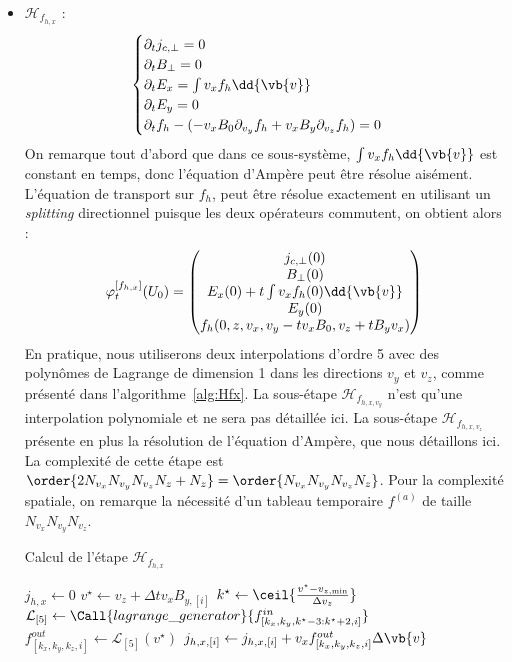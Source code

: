 \begin{itemize}
  \item $\mathcal{H}_{f_{h,x}}$ :
    $$
      \begin{cases}
        \partial_t j_{c,\perp} = 0 \\
        \partial_t B_{\perp} = 0 \\
        \partial_t E_{x} = \int v_xf_h\dd{\vb{v}} \\
        \partial_t E_{y} = 0 \\
        \partial_t f_h - (-v_xB_0\partial_{v_y}f_h + v_xB_y\partial_{v_z}f_h) = 0
      \end{cases}
    $$
    On remarque tout d'abord que dans ce sous-système, $\int v_xf_h\dd{\vb{v}}$ est constant en temps, donc l'équation d'Ampère peut être résolue aisément. L'équation de transport sur $f_h$, peut être résolue exactement en utilisant un \emph{splitting} directionnel puisque les deux opérateurs commutent, on obtient alors :
    $$
      \varphi_t^{[f_{h,x}]}(U_0) = \begin{pmatrix}
        j_{c,\perp}(0) \\
        B_{\perp}(0) \\
        E_x(0) + t\int v_xf_h(0)\dd{\vb{v}} \\
        E_y(0) \\
        f_h(0,z,v_x,v_y-tv_xB_0,v_z+tB_yv_x)
      \end{pmatrix}
    $$
    En pratique, nous utiliserons deux interpolations d'ordre 5 avec des polynômes de Lagrange de dimension 1 dans les directions $v_y$ et $v_z$, comme présenté dans l'algorithme~\ref{alg:Hfx}. La sous-étape $\mathcal{H}_{f_{h,x,v_y}}$ n'est qu'une interpolation polynomiale et ne sera pas détaillée ici. La sous-étape $\mathcal{H}_{f_{h,x,v_z}}$ présente en plus la résolution de l'équation d'Ampère, que nous détaillons ici. La complexité de cette étape est $\order{2N_{v_x}N_{v_y}N_{v_z}N_z + N_z} = \order{N_{v_x}N_{v_y}N_{v_z}N_z}$. Pour la complexité spatiale, on remarque la nécessité d'un tableau temporaire $f^{(a)}$ de taille $N_{v_x}N_{v_y}N_{v_z}$.
    \begin{algorithm}
      \caption{Calcul de l'étape $\mathcal{H}_{f_{h,x}}$}
      \label{alg:Hfx}
      \begin{algorithmic}[1]
          \State $j_{h,x} \gets 0$ 
          \ForAll{$(k_x,k_y,k_z)\in[\![0,N_{v_x}[\![\times[\![0,N_{v_y}[\![\times[\![0,N_{v_z}[\![$}
              \State $v^{\star} \gets v_z + \Delta t v_x B_{y,[i]}$
              \State $k^{\star} \gets \ceil{\frac{ v^{\star}-v_{z,\text{min}} }{ \Delta v_z }}$
              \State $\mathcal{L}_{[5]} \gets \Call{lagrange\_generator}{f^{in}_{[k_x,k_y,k^\star-3:k^\star+2,i]}}$
              \State $f^{out}_{[k_x,k_y,k_z,i]} \gets \mathcal{L}_{[5]}( v^{\star} )$
              \State $j_{h,x,[i]} \gets j_{h,x,[i]} + v_x f^{out}_{[k_x,k_y,k_z,i]} \Delta\vb{v}$
            \EndFor
          \EndFor


\end{algorithmic}
\end{algorithm}
\end{itemize}
